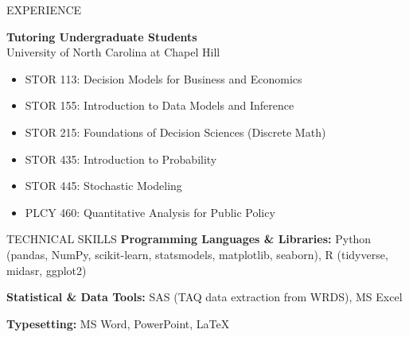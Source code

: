 \documentclass{resume} %
\begin{document}
\begin{rSection}{EXPERIENCE}

\textbf{Tutoring Undergraduate Students} \\
University of North Carolina at Chapel Hill 
 \begin{itemize}
    \itemsep -3pt {}
     \item STOR 113: Decision Models for Business and Economics
     \item STOR 155: Introduction to Data Models and Inference 
     \item STOR 215:  Foundations of Decision Sciences (Discrete Math)
     \item STOR 435: Introduction to Probability
     \item STOR 445: Stochastic Modeling
     \item PLCY 460: Quantitative Analysis for Public Policy
 \end{itemize}

\end{rSection} 



\begin{rSection}{TECHNICAL SKILLS}
    {\bf Programming Languages \& Libraries:} Python (pandas, NumPy, scikit-learn, statsmodels, matplotlib, seaborn), R (tidyverse, midasr, ggplot2)

    {\bf Statistical \& Data Tools:} SAS (TAQ data extraction from WRDS), MS Excel

    {\bf Typesetting:} MS Word, PowerPoint, LaTeX
\end{rSection}
\end{document}
